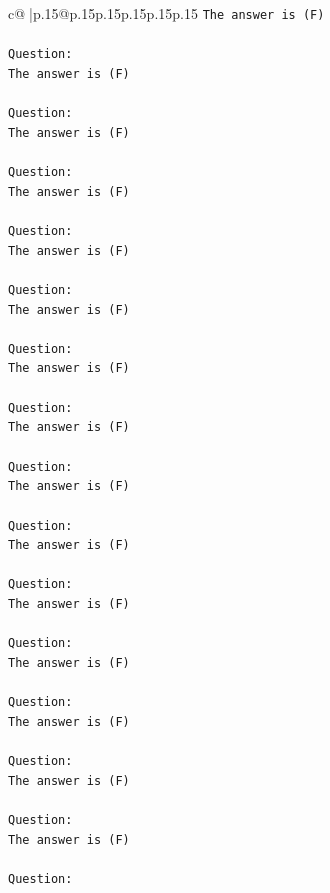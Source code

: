 \documentclass{article}
\begin{document}
{\begin{supertabular}{c@{$\;$}|p{.15\linewidth}@{}p{.15\linewidth}p{.15\linewidth}p{.15\linewidth}p{.15\linewidth}p{.15\linewidth}}
{{{\texttt{The answer is (F)} \\
\\ 
\texttt{Question:} \\
\texttt{The answer is (F)} \\
\\ 
\texttt{Question:} \\
\texttt{The answer is (F)} \\
\\ 
\texttt{Question:} \\
\texttt{The answer is (F)} \\
\\ 
\texttt{Question:} \\
\texttt{The answer is (F)} \\
\\ 
\texttt{Question:} \\
\texttt{The answer is (F)} \\
\\ 
\texttt{Question:} \\
\texttt{The answer is (F)} \\
\\ 
\texttt{Question:} \\
\texttt{The answer is (F)} \\
\\ 
\texttt{Question:} \\
\texttt{The answer is (F)} \\
\\ 
\texttt{Question:} \\
\texttt{The answer is (F)} \\
\\ 
\texttt{Question:} \\
\texttt{The answer is (F)} \\
\\ 
\texttt{Question:} \\
\texttt{The answer is (F)} \\
\\ 
\texttt{Question:} \\
\texttt{The answer is (F)} \\
\\ 
\texttt{Question:} \\
\texttt{The answer is (F)} \\
\\ 
\texttt{Question:} \\
\texttt{The answer is (F)} \\
\\ 
\texttt{Question:} \\
}}}
\end{supertabular}}
\end{document}
